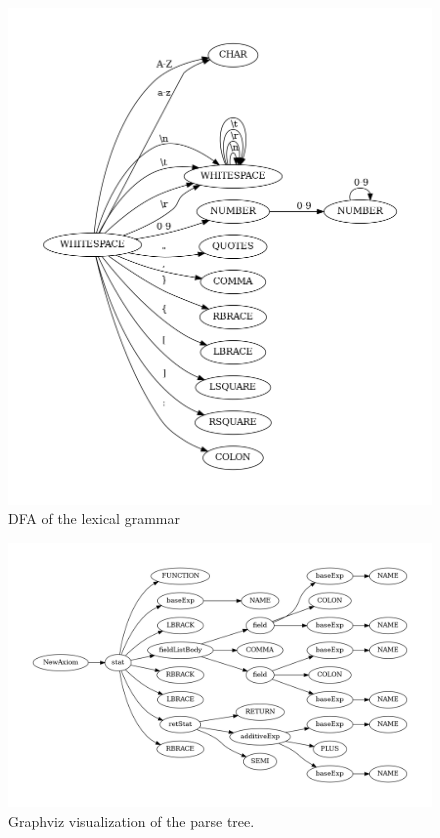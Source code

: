\begin{figure}[t]
\includegraphics[width=\linewidth]{images/dfa.png}
\caption{DFA of the lexical grammar}
\label{fig:dfa}
\end{figure}

\begin{figure}[t]
\includegraphics[width=\linewidth]{images/ptree.png}
\caption{Graphviz visualization of the parse tree.}
\label{fig:parse_tree}
\end{figure}


